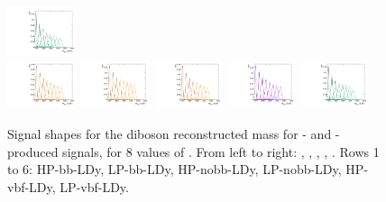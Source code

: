 \begin{figure}[htbp]
  \includegraphics[width=0.18\textwidth]{fig/analysisAppendix/templateSignalVsMX_fromDC_WprToWH_MVV_mu_HP_vbf_LDy.pdf}\\
  \includegraphics[width=0.18\textwidth]{fig/analysisAppendix/templateSignalVsMX_fromDC_GbuToWW_MVV_mu_LP_vbf_LDy.pdf}
  \includegraphics[width=0.18\textwidth]{fig/analysisAppendix/templateSignalVsMX_fromDC_RadToWW_MVV_mu_LP_vbf_LDy.pdf}
  \includegraphics[width=0.18\textwidth]{fig/analysisAppendix/templateSignalVsMX_fromDC_ZprToWW_MVV_mu_LP_vbf_LDy.pdf}
  \includegraphics[width=0.18\textwidth]{fig/analysisAppendix/templateSignalVsMX_fromDC_WprToWZ_MVV_mu_LP_vbf_LDy.pdf}
  \includegraphics[width=0.18\textwidth]{fig/analysisAppendix/templateSignalVsMX_fromDC_WprToWH_MVV_mu_LP_vbf_LDy.pdf}\\
  \caption{
    Signal shapes for the diboson reconstructed mass \MVV for \ggF- and \DY-produced signals, for 8 values of \MX.
    From left to right: \GBulktoWW, \RadtoWW, \ZprtoWW, \WprtoWZ, \WprtoWH.
    Rows 1 to 6: HP-bb-LDy, LP-bb-LDy, HP-nobb-LDy, LP-nobb-LDy, HP-vbf-LDy, LP-vbf-LDy.
  }
  \label{fig:MVVShapes_NonVBF_LDy}
\end{figure}

